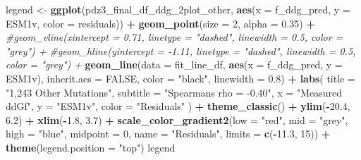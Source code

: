 \documentclass[
]{article}
\newenvironment{Shaded}{\begin{snugshade}}{\end{snugshade}}
\newcommand{\AttributeTok}[1]{\textcolor[rgb]{0.13,0.29,0.53}{#1}}
\newcommand{\CommentTok}[1]{\textcolor[rgb]{0.56,0.35,0.01}{\textit{#1}}}
\newcommand{\ConstantTok}[1]{\textcolor[rgb]{0.56,0.35,0.01}{#1}}
\newcommand{\DecValTok}[1]{\textcolor[rgb]{0.00,0.00,0.81}{#1}}
\newcommand{\FloatTok}[1]{\textcolor[rgb]{0.00,0.00,0.81}{#1}}
\newcommand{\FunctionTok}[1]{\textcolor[rgb]{0.13,0.29,0.53}{\textbf{#1}}}
\newcommand{\NormalTok}[1]{#1}
\newcommand{\OtherTok}[1]{\textcolor[rgb]{0.56,0.35,0.01}{#1}}
\newcommand{\SpecialCharTok}[1]{\textcolor[rgb]{0.81,0.36,0.00}{\textbf{#1}}}
\newcommand{\StringTok}[1]{\textcolor[rgb]{0.31,0.60,0.02}{#1}}
\begin{document}
\begin{Shaded}
\begin{Highlighting}[]
\NormalTok{legend }\OtherTok{\textless{}{-}}  \FunctionTok{ggplot}\NormalTok{(pdz3\_final\_df\_ddg\_2plot\_other, }\FunctionTok{aes}\NormalTok{(}\AttributeTok{x =}\NormalTok{ f\_ddg\_pred, }\AttributeTok{y =}\NormalTok{ ESM1v, }\AttributeTok{color =}\NormalTok{ residuals)) }\SpecialCharTok{+}
  \FunctionTok{geom\_point}\NormalTok{(}\AttributeTok{size =} \DecValTok{2}\NormalTok{, }\AttributeTok{alpha =} \FloatTok{0.35}\NormalTok{) }\SpecialCharTok{+}
  \CommentTok{\#geom\_vline(xintercept = 0.71, linetype = "dashed", linewidth = 0.5, color = "grey") +}
  \CommentTok{\#geom\_hline(yintercept = {-}1.11, linetype = "dashed", linewidth = 0.5, color = "grey") +}
  \FunctionTok{geom\_line}\NormalTok{(}\AttributeTok{data =}\NormalTok{ fit\_line\_df, }\FunctionTok{aes}\NormalTok{(}\AttributeTok{x =}\NormalTok{ f\_ddg\_pred, }\AttributeTok{y =}\NormalTok{ ESM1v),}
            \AttributeTok{inherit.aes =} \ConstantTok{FALSE}\NormalTok{, }\AttributeTok{color =} \StringTok{"black"}\NormalTok{, }\AttributeTok{linewidth =} \FloatTok{0.8}\NormalTok{) }\SpecialCharTok{+}
  \FunctionTok{labs}\NormalTok{(}
    \AttributeTok{title =} \StringTok{"1,243 Other Mutations"}\NormalTok{,}
    \AttributeTok{subtitle =} \StringTok{"Spearman\textquotesingle{}s rho = {-}0.40"}\NormalTok{,}
    \AttributeTok{x =} \StringTok{"Measured ddGf"}\NormalTok{,}
    \AttributeTok{y =} \StringTok{"ESM1v"}\NormalTok{,}
    \AttributeTok{color =} \StringTok{"Residuals"}
\NormalTok{  ) }\SpecialCharTok{+}
  \FunctionTok{theme\_classic}\NormalTok{() }\SpecialCharTok{+}
  \FunctionTok{ylim}\NormalTok{(}\SpecialCharTok{{-}}\FloatTok{20.4}\NormalTok{, }\FloatTok{6.2}\NormalTok{) }\SpecialCharTok{+} \FunctionTok{xlim}\NormalTok{(}\SpecialCharTok{{-}}\FloatTok{1.8}\NormalTok{, }\FloatTok{3.7}\NormalTok{) }\SpecialCharTok{+}
  \FunctionTok{scale\_color\_gradient2}\NormalTok{(}\AttributeTok{low =} \StringTok{"red"}\NormalTok{, }\AttributeTok{mid =} \StringTok{"grey"}\NormalTok{, }\AttributeTok{high =} \StringTok{"blue"}\NormalTok{, }\AttributeTok{midpoint =} \DecValTok{0}\NormalTok{, }\AttributeTok{name =} \StringTok{"Residuals"}\NormalTok{,}
                        \AttributeTok{limits =} \FunctionTok{c}\NormalTok{(}\SpecialCharTok{{-}}\FloatTok{11.3}\NormalTok{, }\DecValTok{15}\NormalTok{)) }\SpecialCharTok{+}
  \FunctionTok{theme}\NormalTok{(}\AttributeTok{legend.position =} \StringTok{"top"}\NormalTok{)}
\NormalTok{legend}
\end{Highlighting}
\end{Shaded}
\end{document}
